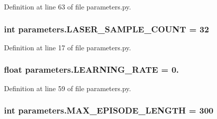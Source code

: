 Definition at line 63 of file parameters.\+py.

\subsubsection[{\texorpdfstring{L\+A\+S\+E\+R\+\_\+\+S\+A\+M\+P\+L\+E\+\_\+\+C\+O\+U\+NT}{LASER_SAMPLE_COUNT}}]{\setlength{\rightskip}{0pt plus 5cm}int parameters.\+L\+A\+S\+E\+R\+\_\+\+S\+A\+M\+P\+L\+E\+\_\+\+C\+O\+U\+NT = 32}\hypertarget{namespaceparameters_a24735dce78cf9899cf1ec4bda2ea4eac}{}\label{namespaceparameters_a24735dce78cf9899cf1ec4bda2ea4eac}


Definition at line 17 of file parameters.\+py.

\subsubsection[{\texorpdfstring{L\+E\+A\+R\+N\+I\+N\+G\+\_\+\+R\+A\+TE}{LEARNING_RATE}}]{\setlength{\rightskip}{0pt plus 5cm}float parameters.\+L\+E\+A\+R\+N\+I\+N\+G\+\_\+\+R\+A\+TE = 0.}\hypertarget{namespaceparameters_afb996d542e8c3d3e8bbdfe4a711694dd}{}\label{namespaceparameters_afb996d542e8c3d3e8bbdfe4a711694dd}


Definition at line 59 of file parameters.\+py.

\subsubsection[{\texorpdfstring{M\+A\+X\+\_\+\+E\+P\+I\+S\+O\+D\+E\+\_\+\+L\+E\+N\+G\+TH}{MAX_EPISODE_LENGTH}}]{\setlength{\rightskip}{0pt plus 5cm}int parameters.\+M\+A\+X\+\_\+\+E\+P\+I\+S\+O\+D\+E\+\_\+\+L\+E\+N\+G\+TH = 300}\hypertarget{namespaceparameters_aa473cc3b100416af3310c6c5a6d19570}{}\label{namespaceparameters_aa473cc3b100416af3310c6c5a6d19570}


